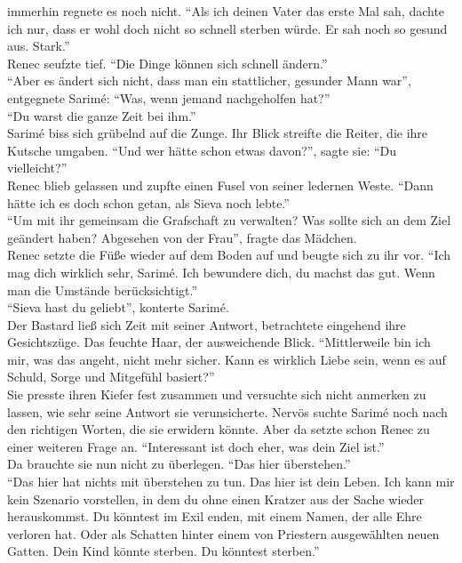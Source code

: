 immerhin regnete es noch nicht. ``Als ich deinen Vater das erste Mal sah, dachte ich nur, dass er 
wohl doch nicht so schnell sterben würde. Er sah noch so gesund aus. Stark.''\\
Renec seufzte tief. ``Die Dinge können sich schnell ändern.''\\
``Aber es ändert sich nicht, dass man ein stattlicher, gesunder Mann war'', entgegnete Sarimé: 
``Was, wenn jemand nachgeholfen hat?''\\
``Du warst die ganze Zeit bei ihm.''\\
Sarimé biss sich grübelnd auf die Zunge. Ihr Blick streifte die Reiter, die ihre Kutsche umgaben. 
``Und wer hätte schon etwas davon?'', sagte sie: ``Du vielleicht?''\\
Renec blieb gelassen und zupfte einen Fusel von seiner ledernen Weste. ``Dann hätte ich es doch 
schon getan, als Sieva noch lebte.''\\
``Um mit ihr gemeinsam die Grafschaft zu verwalten? Was sollte sich an dem Ziel geändert haben? 
Abgesehen von der Frau'', fragte das Mädchen.\\
Renec setzte die Füße wieder auf dem Boden auf und beugte sich zu ihr vor. ``Ich mag dich wirklich 
sehr, Sarimé. Ich bewundere dich, du machst das gut. Wenn man die Umstände berücksichtigt.''\\
``Sieva hast du geliebt'', konterte Sarimé.\\
Der Bastard ließ sich Zeit mit seiner Antwort, betrachtete eingehend ihre Gesichtszüge. Das feuchte 
Haar, der ausweichende Blick. ``Mittlerweile bin ich mir, was das angeht, nicht mehr sicher. Kann 
es wirklich Liebe sein, wenn es auf Schuld, Sorge und Mitgefühl basiert?''\\
Sie presste ihren Kiefer fest zusammen und versuchte sich nicht anmerken zu lassen, wie sehr seine 
Antwort sie verunsicherte. Nervös suchte Sarimé noch nach den richtigen Worten, die sie erwidern 
könnte. Aber da setzte schon Renec zu einer weiteren Frage an. ``Interessant ist doch eher, was dein 
Ziel ist.''\\
Da brauchte sie nun nicht zu überlegen. ``Das hier überstehen.''\\
``Das hier hat nichts mit überstehen zu tun. Das hier ist dein Leben. Ich kann mir kein Szenario 
vorstellen, in dem du ohne einen Kratzer aus der Sache wieder herauskommst. Du könntest im Exil 
enden, mit einem Namen, der alle Ehre verloren hat. Oder als Schatten hinter einem von Priestern 
ausgewählten neuen Gatten. Dein Kind könnte sterben. Du könntest sterben.''\\
